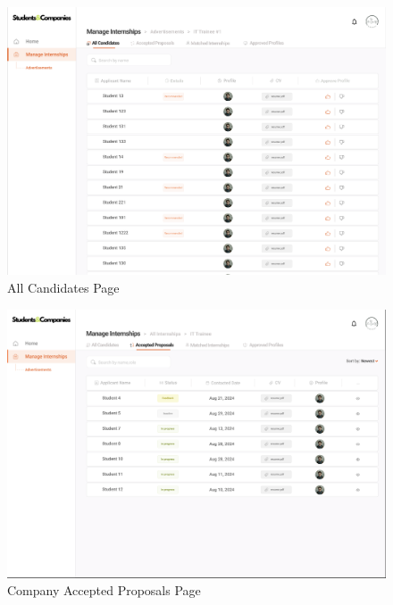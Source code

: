 \documentclass[a4paper,12pt]{article}
\begin{document}
\begin{figure}[H]
    \centering
    \includegraphics[scale = 0.42]{figures/UserInterfaces/Company/AllCandidatesCompany.png}
    \caption{All Candidates Page}
     \centering
\end{figure}
\begin{figure}[H]
    \centering
    \includegraphics[scale = 0.42]{figures/UserInterfaces/Company/AcceptedProposalCompany.png}
    \caption{Company Accepted Proposals Page}
     \centering
\end{figure}
\end{document}
